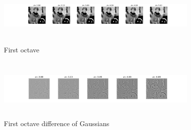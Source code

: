 \documentclass[a4paper, nobib]{tufte-handout}
\begin{document}
\begin{figure}[htpb]
  \centering
  \includegraphics[width=10cm,height=3cm]{./octave1.png}
  \caption{First octave}%
    \label{fig:octave1}
\end{figure}

\begin{figure}[htpb]
  \centering
  \includegraphics[width=10cm,height=3cm]{./octave1_dog.png}
  \caption{First octave difference of Gaussians}%
  \label{fig:octave_dog}
\end{figure}




\end{document}
